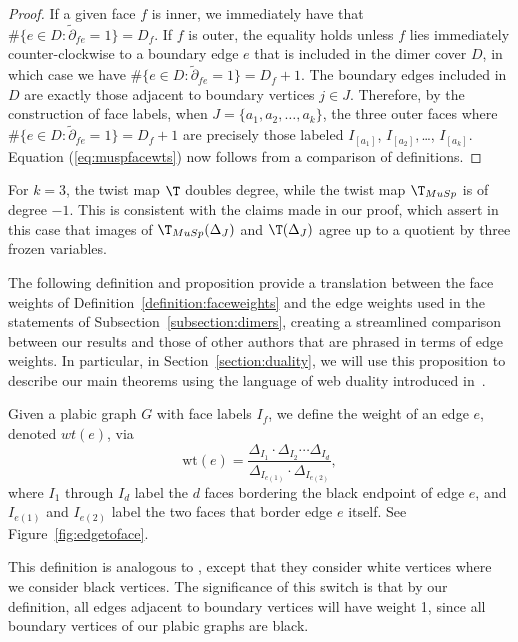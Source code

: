 \begin{proof}
If a given face $f$ is inner, we immediately have that $\#\{e \in D : \tilde{\partial}_{fe} = 1\} = D_f$. If $f$ is outer, the equality holds unless $f$ lies immediately counter-clockwise to a boundary edge $e$ that is included in the dimer cover $D$, in which case we have $\#\{e \in D : \tilde{\partial}_{fe} = 1\} = D_f+1$. The boundary edges included in $D$ are exactly those adjacent to boundary vertices $j \in J$. Therefore, by the construction of face labels, when $J = \{a_1,a_2,\dots, a_k\}$, the three outer faces where $\#\{e \in D : \tilde{\partial}_{fe} = 1\} = D_f + 1$ are precisely those labeled $I_{[a_1]}$, $I_{[a_2]},$\dots, $I_{[a_k]}$. Equation (\ref{eq:muspfacewts}) now follows from a comparison of definitions.
\end{proof}


\begin{rema}
\label{rem:twistdegrees}
For $k=3$, the twist map $\T$ doubles degree, while the twist map $\T_{MuSp}$ is of degree $-1$. This is consistent with the claims made in our proof, which assert in this case that images of $\T_{MuSp}(\Delta_J)$ and $\T(\Delta_J)$ agree up to a quotient by three frozen variables.
\end{rema}

The following definition and proposition provide a translation between the face weights of Definition~\ref{definition:faceweights} and the edge weights used in the statements of Subsection~\ref{subsection:dimers}, creating a streamlined comparison between our results and those of other authors that are phrased in terms of edge weights. In particular, in Section~\ref{section:duality}, we will use this proposition to describe our main theorems using the language of web duality introduced in~\cite{fll2019}.
\begin{defi}\label{def:MaScEdgeWeights}
Given a plabic graph $G$ with face labels $I_f$, we define the weight of an edge $e$, denoted $wt(e)$, via
$$\text{wt}(e) = \frac{\Delta_{I_1}\cdot \Delta_{I_2} \cdots \Delta_{I_d}}{\Delta_{{I_{e(1)}}}\cdot \Delta_{I_{e(2)}}},$$
where $I_1$ through $I_d$ label the $d$ faces bordering the black endpoint of edge $e$, and $I_{e(1)}$ and $I_{e(2)}$ label the two faces that border edge $e$ itself. See Figure~\ref{fig:edgetoface}.
\end{defi}
\begin{rema}
This definition is analogous to \cite[Definition 7.1]{marshscott2016}, except that they consider white vertices where we consider black vertices. The significance of this switch is that by our definition, all edges adjacent to boundary vertices will have weight 1, since all boundary vertices of our plabic graphs are black.
\end{rema}

